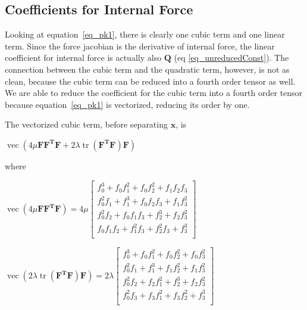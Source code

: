 \documentclass[twocolumn,10pt]{asme2ej}
\DeclareMathOperator{\vect}{vec}
\DeclareMathOperator{\tr}{tr}
\begin{document}
\subsection{Coefficients for Internal Force}

Looking at equation~\ref{eq_pk1}, there is clearly one cubic term and one linear term. Since the force jacobian is the derivative of internal force, the linear coefficient for internal force is actually also $\bm{Q}$ (eq \ref{eq_unreducedConst}). The connection between the cubic term and the quadratic term, however, is not as clean, because the cubic term can be reduced into a fourth order tensor as well. We are able to reduce the coefficient for the cubic term into a fourth order tensor because equation~\ref{eq_pk1} is vectorized, reducing its order by one.

The vectorized cubic term, before separating $\bm{x}$, is

\begin{center}
  $\vect \left( 4\mu\bm{FF^TF} + 2\lambda\tr\left(\bm{F^TF}\right)\bm{F}\right)$
\end{center}

where

\begin{center}
  $\vect \left( 4\mu\bm{FF^TF} \right) = 4\mu
  \begin{bmatrix}
    f_{0}^3 + f_0f_{1}^2 + f_0f_{2}^2 + f_1f_2f_3 \\
    f_{0}^2f_{1} + f_{1}^3 + f_0f_2f_3 + f_1f_{3}^2 \\
    f_{0}^2f_{2} + f_0f_1f_3 + f_{2}^3 + f_2f_{3}^2 \\
    f_0f_1f_2 + f_{1}^2f_3 + f_{2}^2f_3 + f_{3}^3 \\
    \end{bmatrix}$

    \bigskip
    $\vect \left( 2\lambda\tr\left(\bm{F^TF}\right)\bm{F} \right) = 2\lambda
    \begin{bmatrix}
      f_{0}^3 + f_0f_{1}^2 + f_0f_{2}^2 + f_0f_{3}^2 \\
      f_{0}^2f_1 + f_{1}^3 + f_1f_{2}^2 + f_1f_{3}^2 \\
      f_{0}^2f_2 + f_2f_{1}^2 + f_{2}^3 + f_2f_{3}^2 \\
      f_{0}^2f_3 + f_3f_{1}^2 + f_3f_{2}^2 + f_{3}^3\\
      \end{bmatrix}$
\end{center}
\end{document}
